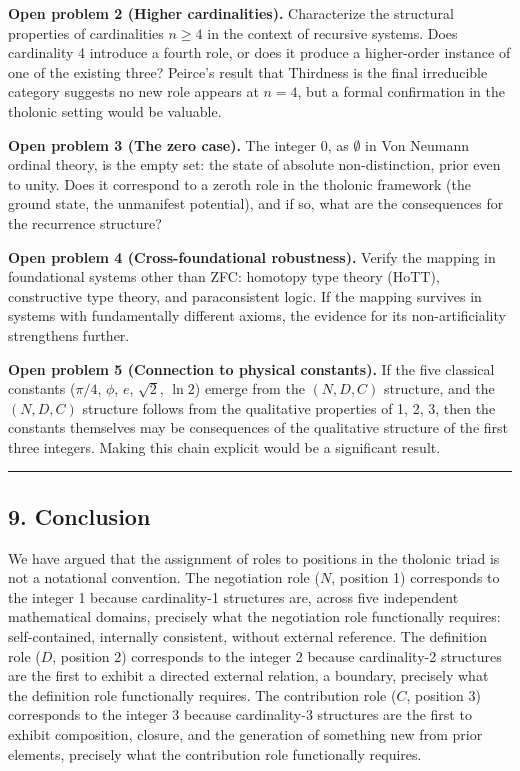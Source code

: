 \documentclass[
  11pt,
  letterpaper,
]{article}
\begin{document}
\textbf{Open problem 2 (Higher cardinalities).} Characterize the
structural properties of cardinalities \(n \ge 4\) in the context of
recursive systems. Does cardinality 4 introduce a fourth role, or does
it produce a higher-order instance of one of the existing three?
Peirce's result that Thirdness is the final irreducible category
suggests no new role appears at \(n = 4\), but a formal confirmation in
the tholonic setting would be valuable.

\textbf{Open problem 3 (The zero case).} The integer 0, as \(\emptyset\)
in Von Neumann ordinal theory, is the empty set: the state of absolute
non-distinction, prior even to unity. Does it correspond to a zeroth
role in the tholonic framework (the ground state, the unmanifest
potential), and if so, what are the consequences for the recurrence
structure?

\textbf{Open problem 4 (Cross-foundational robustness).} Verify the
mapping in foundational systems other than ZFC: homotopy type theory
(HoTT), constructive type theory, and paraconsistent logic. If the
mapping survives in systems with fundamentally different axioms, the
evidence for its non-artificiality strengthens further.

\textbf{Open problem 5 (Connection to physical constants).} If the five
classical constants (\(\pi/4\), \(\phi\), \(e\), \(\sqrt{2}\),
\(\ln 2\)) emerge from the \((N, D, C)\) structure, and the
\((N, D, C)\) structure follows from the qualitative properties of 1, 2,
3, then the constants themselves may be consequences of the qualitative
structure of the first three integers. Making this chain explicit would
be a significant result.

\begin{center}\rule{0.5\linewidth}{0.5pt}\end{center}

\subsection{9. Conclusion}\label{conclusion}

We have argued that the assignment of roles to positions in the tholonic
triad is not a notational convention. The negotiation role (\(N\),
position 1) corresponds to the integer 1 because cardinality-1
structures are, across five independent mathematical domains, precisely
what the negotiation role functionally requires: self-contained,
internally consistent, without external reference. The definition role
(\(D\), position 2) corresponds to the integer 2 because cardinality-2
structures are the first to exhibit a directed external relation, a
boundary, precisely what the definition role functionally requires. The
contribution role (\(C\), position 3) corresponds to the integer 3
because cardinality-3 structures are the first to exhibit composition,
closure, and the generation of something new from prior elements,
precisely what the contribution role functionally requires.
\end{document}
